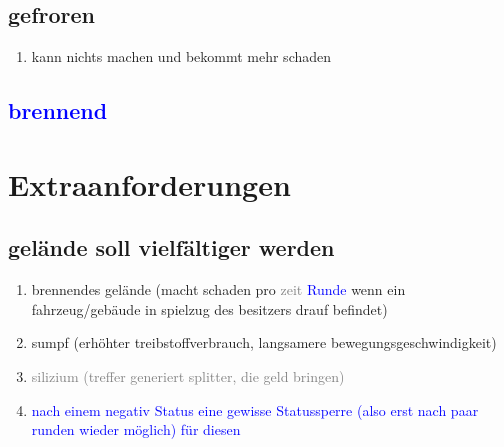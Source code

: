 \documentclass[10pt,a4paper,final]{scrartcl}
\newcommand{\unwichtig}[1]{\textcolor{gray}{#1}}
\newcommand{\notiz}[1]{\textcolor{blue}{#1}}
\begin{document}
\subsection{gefroren}
\begin{enumerate}
\item kann nichts machen und bekommt mehr schaden
\end{enumerate}

\subsection{\notiz{brennend}}


\section{Extraanforderungen}
\subsection{gelände soll vielfältiger werden }
\begin{enumerate}
\item brennendes gelände (macht schaden pro \unwichtig{zeit} \notiz{Runde} wenn ein fahrzeug/gebäude in spielzug des besitzers drauf befindet)
\item sumpf (erhöhter treibstoffverbrauch, langsamere bewegungsgeschwindigkeit)
\item \unwichtig{silizium (treffer generiert splitter, die geld bringen)}

\item \notiz{nach einem negativ Status eine gewisse Statussperre (also erst nach paar runden wieder möglich) für diesen}
\end{enumerate}
\end{document}
